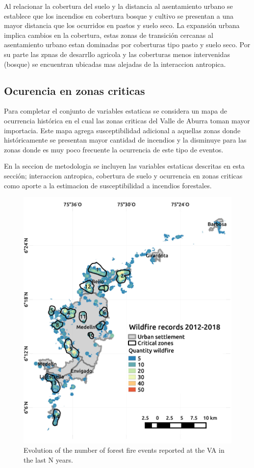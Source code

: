 Al relacionar la cobertura del suelo y la distancia al asentamiento urbano se establece que los incendios en cobertura bosque y cultivo se presentan a una mayor distancia que los ocurridos en pastos y suelo seco. La expansión urbana implica cambios en la cobertura, estas zonas de transición cercanas al asentamiento urbano estan dominadas por coberturas tipo pasto y suelo seco. Por su parte las zpnas de desarrllo agricola y las coberturas menos intervenidas (bosque) se encuentran ubicadas mas alejadas de la interaccion antropica.  


\subsection*{Ocurencia en zonas criticas}

Para completar el conjunto de variables estaticas se considera un mapa de ocurrencia histórica en el cual las zonas criticas del Valle de Aburra toman mayor importacia. Este mapa agrega susceptibilidad adicional a aquellas zonas donde históricamente se presentan mayor cantidad de incendios y la disminuye para las zonas donde es muy poco frecuente la ocurrencia de este tipo de eventos.


En la seccion de metodologia se incluyen las variables estaticas descritas en esta sección; interaccion antropica, cobertura de suelo y ocurrencia en zonas criticas como aporte a la estimacion de susceptibilidad a incendios forestales.

\begin{figure}[h]
\centering
\includegraphics[width=8.cm]{Figuras/map_intro.pdf}
\caption{Evolution of the number of forest fire events reported at the VA in the last N years.}
\label{fig:incendios_mapas}
\end{figure}

